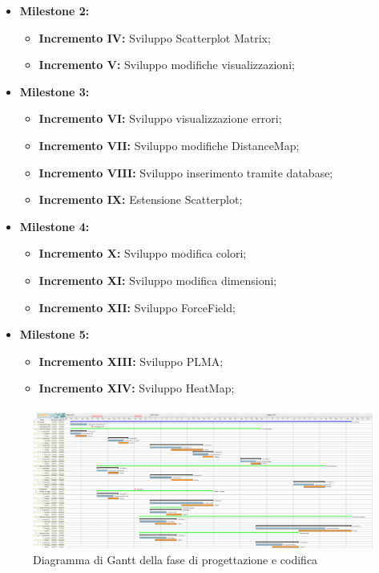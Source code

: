 \documentclass[../piano_di_progetto.tex]{subfiles}
\begin{document}
\begin{itemize}
\begin{itemize}
    \item \textbf{Milestone 2:}
        \begin{itemize}
            \item \textbf{Incremento IV:} Sviluppo Scatterplot Matrix;
            \item \textbf{Incremento V:} Sviluppo modifiche visualizzazioni;
	\end{itemize}
    \item \textbf{Milestone 3:}
        \begin{itemize}
            \item \textbf{Incremento VI:} Sviluppo visualizzazione errori;
            \item \textbf{Incremento VII:} Sviluppo modifiche DistanceMap;
            \item \textbf{Incremento VIII:} Sviluppo inserimento tramite database;
            \item \textbf{Incremento IX:} Estensione Scatterplot;
    \end{itemize}
    \item \textbf{Milestone 4:}
        \begin{itemize}
            \item \textbf{Incremento X:} Sviluppo modifica colori;
            \item \textbf{Incremento XI:} Sviluppo modifica dimensioni;
            \item \textbf{Incremento XII:} Sviluppo ForceField;
    \end{itemize}
    \item \textbf{Milestone 5:}
        \begin{itemize}
            \item \textbf{Incremento XIII:} Sviluppo PLMA;
            \item \textbf{Incremento XIV:} Sviluppo HeatMap;
    \end{itemize}
\end{itemize}
\end{itemize}


\begin{figure}[H]
    \centering
    \includegraphics[width=18cm]{src/img/gantt/documenti_riveduti_RQ.png}
    \caption{Diagramma di Gantt della fase di progettazione e codifica}

\end{figure}
\end{document}
